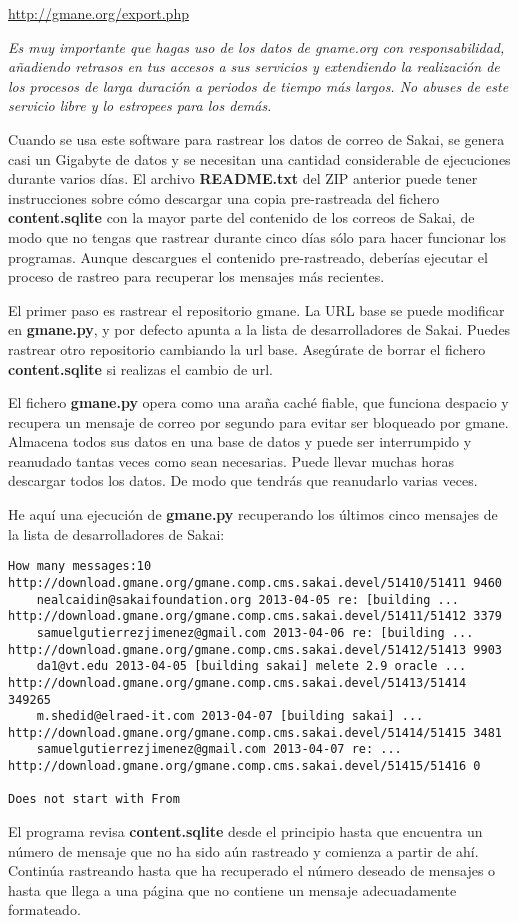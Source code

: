 \url{http://gmane.org/export.php}

{\em Es muy importante que hagas uso de los datos de gname.org con
responsabilidad, añadiendo retrasos en tus accesos a sus servicios y extendiendo
la realización de los procesos de larga duración a periodos de tiempo más largos.
No abuses de este servicio libre y lo estropees para los demás.}

Cuando se usa este software para rastrear los datos de correo de Sakai, se genera casi
un Gigabyte de datos y se necesitan una cantidad considerable de ejecuciones durante varios días.
El archivo {\bf README.txt} del ZIP anterior puede tener instrucciones sobre cómo
descargar una copia pre-rastreada del fichero {\bf content.sqlite} con
la mayor parte del contenido de los correos de Sakai, de modo que no tengas que rastrear
durante cinco días sólo para hacer funcionar los programas. Aunque descargues el contenido
pre-rastreado, deberías ejecutar el proceso de rastreo para recuperar los
mensajes más recientes.

El primer paso es rastrear el repositorio gmane. La URL base
se puede modificar en {\bf gmane.py}, y por defecto apunta a la lista
de desarrolladores de Sakai. Puedes rastrear otro repositorio cambiando la
url base. Asegúrate de borrar el fichero {\bf content.sqlite} si realizas
el cambio de url.

El fichero {\bf gmane.py} opera como una araña caché fiable, que
funciona despacio y recupera un mensaje de correo por segundo para
evitar ser bloqueado por gmane. Almacena todos sus datos
en una base de datos y puede ser interrumpido y reanudado tantas veces como
sean necesarias. Puede llevar muchas horas descargar todos los datos.
De modo que tendrás que reanudarlo varias veces.

He aquí una ejecución de {\bf gmane.py} recuperando los últimos cinco mensajes de
la lista de desarrolladores de Sakai:

\beforeverb
\begin{verbatim}
How many messages:10
http://download.gmane.org/gmane.comp.cms.sakai.devel/51410/51411 9460
    nealcaidin@sakaifoundation.org 2013-04-05 re: [building ...
http://download.gmane.org/gmane.comp.cms.sakai.devel/51411/51412 3379
    samuelgutierrezjimenez@gmail.com 2013-04-06 re: [building ...
http://download.gmane.org/gmane.comp.cms.sakai.devel/51412/51413 9903
    da1@vt.edu 2013-04-05 [building sakai] melete 2.9 oracle ...
http://download.gmane.org/gmane.comp.cms.sakai.devel/51413/51414 349265
    m.shedid@elraed-it.com 2013-04-07 [building sakai] ...
http://download.gmane.org/gmane.comp.cms.sakai.devel/51414/51415 3481
    samuelgutierrezjimenez@gmail.com 2013-04-07 re: ...
http://download.gmane.org/gmane.comp.cms.sakai.devel/51415/51416 0

Does not start with From 
\end{verbatim}
\afterverb
%
El programa revisa {\bf content.sqlite} desde el principio hasta que encuentra un número de mensaje que
no ha sido aún rastreado y comienza a partir de ahí. Continúa rastreando
hasta que ha recuperado el número deseado de mensajes o hasta que llega a una página
que no contiene un mensaje adecuadamente formateado.

